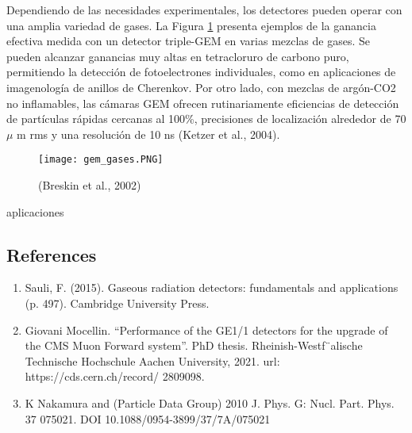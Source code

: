 \documentclass{article}
\begin{document}
\noindent Dependiendo de las necesidades experimentales, los detectores pueden operar con una amplia variedad de gases. La Figura \ref{fig:gem_gases} presenta ejemplos de la ganancia efectiva medida con un detector triple-GEM en varias mezclas de gases. Se pueden alcanzar ganancias muy altas en tetracloruro de carbono puro, permitiendo la detección de fotoelectrones individuales, como en aplicaciones de imagenología de anillos de Cherenkov. Por otro lado, con mezclas de argón-CO2 no inflamables, las cámaras GEM ofrecen rutinariamente eficiencias de detección de partículas rápidas cercanas al 100\%, precisiones de localización alrededor de 70 $\mu$ m rms y una resolución de 10 ns (Ketzer et al., 2004).

\begin{figure}[H]
    \centering
    \texttt{[image: gem\_gases.PNG]}
    \caption{(Breskin et al., 2002)}
    \label{fig:gem_gases}
\end{figure}

\noindent aplicaciones
\subsection*{References}
\begin{enumerate}
    \item Sauli, F. (2015). Gaseous radiation detectors: fundamentals and applications (p. 497). Cambridge University Press.
    \item Giovani Mocellin. “Performance of the GE1/1 detectors for the upgrade of the
    CMS Muon Forward system”. PhD thesis. Rheinish-Westf¨alische Technische
    Hochschule Aachen University, 2021. url: https://cds.cern.ch/record/
    2809098.
    \item K Nakamura and (Particle Data Group) 2010 J. Phys. G: Nucl. Part. Phys. 37 075021. DOI 10.1088/0954-3899/37/7A/075021
\end{enumerate}



\end{document}
